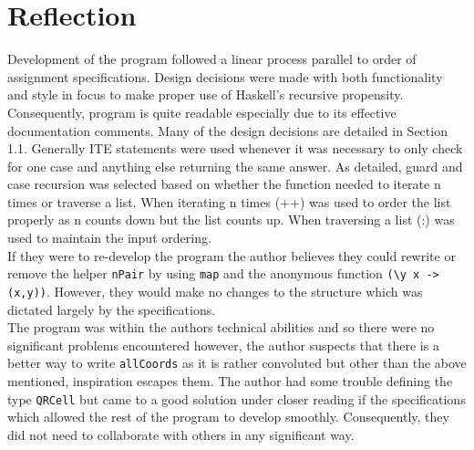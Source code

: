 \documentclass[11pt]{article}
\begin{document}
\section{Reflection}
   Development of the program followed a linear process parallel to order of assignment specifications.  Design decisions were made with both functionality and style in focus to make proper use of Haskell's recursive propensity. Consequently, program is quite readable especially due to its effective documentation comments. Many of the design decisions are detailed in Section 1.1. Generally ITE statements were used whenever it was necessary to only check for one case and anything else returning the same answer. As detailed, guard and case recursion was selected based on whether the function needed to iterate n times or traverse a list. When iterating n times (++) was used to order the list properly as n counts down but the list counts up. When traversing a list (:) was used to maintain the input ordering. \\
   
   If they were to re-develop the program the author believes they could rewrite or remove the helper  \verb|nPair| by using \verb|map| and the anonymous function \verb|(\y x -> (x,y))|. However, they would make no changes to the structure which was dictated largely by the specifications.\\
   
   The program was within the authors technical abilities and so there were no significant problems encountered however, the author suspects that there is a better way to write \verb|allCoords| as it is rather convoluted but other than the above mentioned, inspiration escapes them. The author had some trouble defining the type \verb|QRCell| but came to a good solution under closer reading if the specifications which allowed the rest of the program to develop smoothly. Consequently, they did not need to collaborate with others in any significant way.






\end{document}
